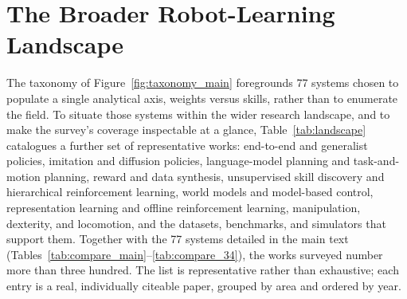 \documentclass[acmsmall,screen,nonacm]{acmart}
\begin{document}
%
\clearpage
%
%
\appendix
\section{The Broader Robot-Learning Landscape}
\label{sec:landscape}

The taxonomy of Figure~\ref{fig:taxonomy_main} foregrounds 77 systems chosen to populate a single
analytical axis, weights versus skills, rather than to enumerate the field. To situate those systems
within the wider research landscape, and to make the survey's coverage inspectable at a glance,
Table~\ref{tab:landscape} catalogues a further set of representative works: end-to-end and generalist
policies, imitation and diffusion policies, language-model planning and task-and-motion planning,
reward and data synthesis, unsupervised skill discovery and hierarchical reinforcement learning, world
models and model-based control, representation learning and offline reinforcement learning,
manipulation, dexterity, and locomotion, and the datasets, benchmarks, and simulators that support
them. Together with the 77 systems detailed in the main text
(Tables~\ref{tab:compare_main}--\ref{tab:compare_34}), the works surveyed number more than three
hundred. The list is representative rather than exhaustive; each entry is a real, individually
citeable paper, grouped by area and ordered by year.
\end{document}
